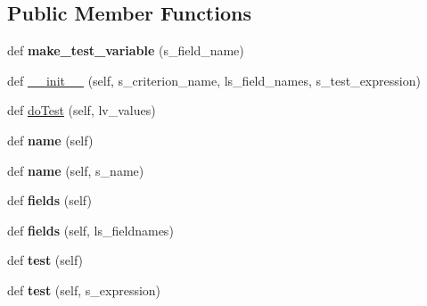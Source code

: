 \subsection*{Public Member Functions}
\begin{DoxyCompactItemize}
\item 
def {\bfseries make\+\_\+test\+\_\+variable} (s\+\_\+field\+\_\+name)\hypertarget{classnegui_1_1genepopindividualid_1_1GenepopIndivCriterion_a2ab1a84a106514282b5c70a9033914c5}{}\label{classnegui_1_1genepopindividualid_1_1GenepopIndivCriterion_a2ab1a84a106514282b5c70a9033914c5}

\item 
def \hyperlink{classnegui_1_1genepopindividualid_1_1GenepopIndivCriterion_a58d025aa5c671e8c07fc9f0bbe56e588}{\+\_\+\+\_\+init\+\_\+\+\_\+} (self, s\+\_\+criterion\+\_\+name, ls\+\_\+field\+\_\+names, s\+\_\+test\+\_\+expression)
\item 
def \hyperlink{classnegui_1_1genepopindividualid_1_1GenepopIndivCriterion_a7f540e7e62b1c078ed06bb42a07f34f6}{do\+Test} (self, lv\+\_\+values)
\item 
def {\bfseries name} (self)\hypertarget{classnegui_1_1genepopindividualid_1_1GenepopIndivCriterion_a99d76ccf4421f71f84f2cbd4ecfad4f8}{}\label{classnegui_1_1genepopindividualid_1_1GenepopIndivCriterion_a99d76ccf4421f71f84f2cbd4ecfad4f8}

\item 
def {\bfseries name} (self, s\+\_\+name)\hypertarget{classnegui_1_1genepopindividualid_1_1GenepopIndivCriterion_a06866e0e47fa5269dcd20a6a576a56fb}{}\label{classnegui_1_1genepopindividualid_1_1GenepopIndivCriterion_a06866e0e47fa5269dcd20a6a576a56fb}

\item 
def {\bfseries fields} (self)\hypertarget{classnegui_1_1genepopindividualid_1_1GenepopIndivCriterion_abc0d0649b56e6e9fd578bf57941f717c}{}\label{classnegui_1_1genepopindividualid_1_1GenepopIndivCriterion_abc0d0649b56e6e9fd578bf57941f717c}

\item 
def {\bfseries fields} (self, ls\+\_\+fieldnames)\hypertarget{classnegui_1_1genepopindividualid_1_1GenepopIndivCriterion_a2ecc478307996482b6c5823475dbbad1}{}\label{classnegui_1_1genepopindividualid_1_1GenepopIndivCriterion_a2ecc478307996482b6c5823475dbbad1}

\item 
def {\bfseries test} (self)\hypertarget{classnegui_1_1genepopindividualid_1_1GenepopIndivCriterion_a002f19332a8434e4d1fba8be4d6d3134}{}\label{classnegui_1_1genepopindividualid_1_1GenepopIndivCriterion_a002f19332a8434e4d1fba8be4d6d3134}

\item 
def {\bfseries test} (self, s\+\_\+expression)\hypertarget{classnegui_1_1genepopindividualid_1_1GenepopIndivCriterion_a0b5653aacdb42c7f92fce358021c307b}{}\label{classnegui_1_1genepopindividualid_1_1GenepopIndivCriterion_a0b5653aacdb42c7f92fce358021c307b}

\end{DoxyCompactItemize}
